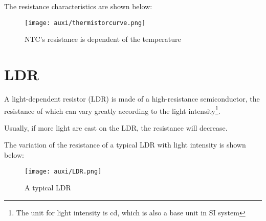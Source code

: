 \documentclass[a4paper]{tufte-handout}
\newenvironment{SummBox}
{\begin{tcolorbox}[breakable,colback=r1!30,colframe=r1,title=Summary]} {\end{tcolorbox}}
\begin{document}
The resistance characteristics are shown below:
\begin{figure}[h]
\centering
\texttt{[image: auxi/thermistorcurve.png]}
\caption{NTC's resistance is dependent of the temperature}
\end{figure}

\section{LDR}
A light-dependent resistor (LDR) is made of a high-resistance semiconductor, the resistance of which can vary greatly according to the light intensity\footnote{The unit for light intensity is \si{\candela}, which is also a base unit in SI system}.
\begin{SummBox}
Usually, if more light are cast on the LDR, the resistance will decrease.
\end{SummBox}
The variation of the resistance of a typical LDR with light intensity is shown below:
\begin{figure}[h]
\centering
\texttt{[image: auxi/LDR.png]}
\caption{A typical LDR}
\end{figure}
\end{document}
